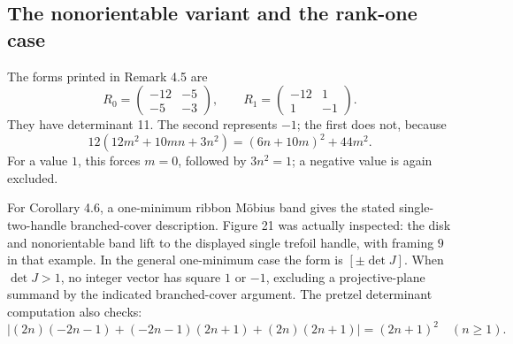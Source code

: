 \documentclass[10pt]{article}
\begin{document}
\subsection*{The nonorientable variant and the rank-one case}
The forms printed in Remark 4.5 are \[R_0=\begin{pmatrix}-12&-5\\-5&-3\end{pmatrix},
 \qquad
 R_1=\begin{pmatrix}-12&1\\1&-1\end{pmatrix}.\] They have determinant 11. The second represents \(-1\); the first does not, because \[12(12m^2+10mn+3n^2)=(6n+10m)^2+44m^2.\] For a value \(1\), this forces \(m=0\), followed by \(3n^2=1\); a negative value is again excluded.\par
For Corollary 4.6, a one-minimum ribbon Möbius band gives the stated single-two-handle branched-cover description. Figure 21 was actually inspected: the disk and nonorientable band lift to the displayed single trefoil handle, with framing \(9\) in that example. In the general one-minimum case the form is \([\pm\det J]\). When \(\det J>1\), no integer vector has square \(1\) or \(-1\), excluding a projective-plane summand by the indicated branched-cover argument. The pretzel determinant computation also checks: \[\left|(2n)(-2n-1)+(-2n-1)(2n+1)+(2n)(2n+1)\right|
 =(2n+1)^2\quad(n\geq1).\]\par
\end{document}
